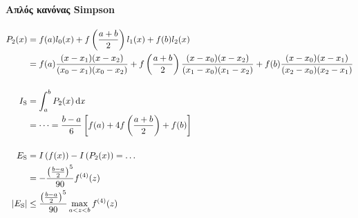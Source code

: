 \documentclass[11pt,a4paper,notitlepage,fleqn]{article}
\begin{document}
    \paragraph{Απλός κανόνας Simpson}
    \begin{align*}
    	P_2(x) &= f(a)l_0(x) +f\left(\frac{a+b}{2}\right)l_1(x)+f(b)
    	l_2(x) \\ &= f(a) \frac{(x-x_1)(x-x_2)}{(x_0-x_1)(x_0-x_2)}
    	+ f\left(\frac{a+b}{2}\right)
    	\frac{(x-x_0)(x-x_2)}{(x_1-x_0)(x_1-x_2)}
    	+ f(b) \frac{(x-x_0)(x-x_1)}{(x_2-x_0)(x_2-x_1)}
    	\\[3ex]
    	I_{\mathrm S} &= \int_a^b P_2(x)\mathop{}\!\mathrm{d} x
    	\\ &= \dots = \frac{b-a}{6} \left[
    	f(a)+4f\left(\frac{a+b}{2}\right)+f(b) \right] \\[3ex]
    	E_{\mathrm S} &= I\left(f(x)\right)-I\left(P_2(x)\right) = \dots
    	\\ &= -\frac{\left(\frac{b-a}{2}\right)^5}{90} f^{(4)}(z) \\
    	\left|E_{\mathrm S}\right| &\leq
    	\frac{\left(\frac{b-a}{2}\right)^5}{90}\max_{a<z<b}f^{(4)}(z)
    \end{align*}
\end{document}
